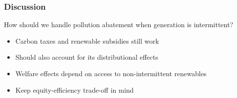 \documentclass[aspectratio=169]{beamer}
\begin{document}
	
	
	
	\begin{frame}
		\frametitle{Discussion}
		
		\begin{block}{How should we handle pollution abatement when generation is intermittent?}
			\begin{itemize}
				\setlength\itemsep{0.5em}
				\item Carbon taxes and renewable subsidies still work
				\item Should also account for its distributional effects
				\item Welfare effects depend on access to non-intermittent renewables
				\item Keep equity-efficiency trade-off in mind
			\end{itemize}
		\end{block}
	\end{frame}
	
\end{document}
